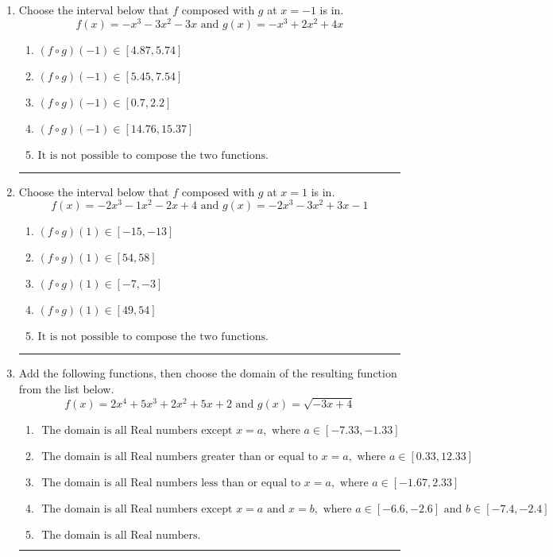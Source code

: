 \documentclass[14pt]{extbook}
\newcommand{\litem}[1]{\item#1\hspace*{-1cm}\rule{\textwidth}{0.4pt}}
\begin{document}
\begin{enumerate}
\litem{
Choose the interval below that $f$ composed with $g$ at $x=-1$ is in.\[ f(x) = -x^{3} -3 x^{2} -3 x \text{ and } g(x) = -x^{3} +2 x^{2} +4 x \]\begin{enumerate}[label=\Alph*.]
\item \( (f \circ g)(-1) \in [4.87, 5.74] \)
\item \( (f \circ g)(-1) \in [5.45, 7.54] \)
\item \( (f \circ g)(-1) \in [0.7, 2.2] \)
\item \( (f \circ g)(-1) \in [14.76, 15.37] \)
\item \( \text{It is not possible to compose the two functions.} \)

\end{enumerate} }
\litem{
Choose the interval below that $f$ composed with $g$ at $x=1$ is in.\[ f(x) = -2x^{3} -1 x^{2} -2 x + 4 \text{ and } g(x) = -2x^{3} -3 x^{2} +3 x -1 \]\begin{enumerate}[label=\Alph*.]
\item \( (f \circ g)(1) \in [-15, -13] \)
\item \( (f \circ g)(1) \in [54, 58] \)
\item \( (f \circ g)(1) \in [-7, -3] \)
\item \( (f \circ g)(1) \in [49, 54] \)
\item \( \text{It is not possible to compose the two functions.} \)

\end{enumerate} }
\litem{
Add the following functions, then choose the domain of the resulting function from the list below.\[ f(x) = 2x^{4} +5 x^{3} +2 x^{2} +5 x + 2 \text{ and } g(x) = \sqrt{-3x+4}  \]\begin{enumerate}[label=\Alph*.]
\item \( \text{ The domain is all Real numbers except } x = a, \text{ where } a \in [-7.33, -1.33] \)
\item \( \text{ The domain is all Real numbers greater than or equal to } x = a, \text{ where } a \in [0.33, 12.33] \)
\item \( \text{ The domain is all Real numbers less than or equal to } x = a, \text{ where } a \in [-1.67, 2.33] \)
\item \( \text{ The domain is all Real numbers except } x = a \text{ and } x = b, \text{ where } a \in [-6.6, -2.6] \text{ and } b \in [-7.4, -2.4] \)
\item \( \text{ The domain is all Real numbers. } \)


\end{enumerate}}
\end{enumerate}
\end{document}
